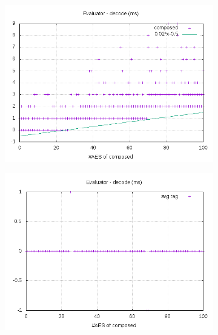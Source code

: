 \documentclass[10pt,a4paper]{article}
\begin{document}
\begin{figure}[h]
    \begin{subfigure}[t]{0.3\textwidth}
        \includegraphics[width=\textwidth]{eval_decode_plots}
        \caption{}
    \end{subfigure}
    \begin{subfigure}[t]{0.3\textwidth}
        \includegraphics[width=\textwidth]{eval_decode_avg}
        \caption{}
    \end{subfigure}
    \begin{subfigure}[t]{0.3\textwidth}

\end{subfigure}
\end{figure}
\end{document}
